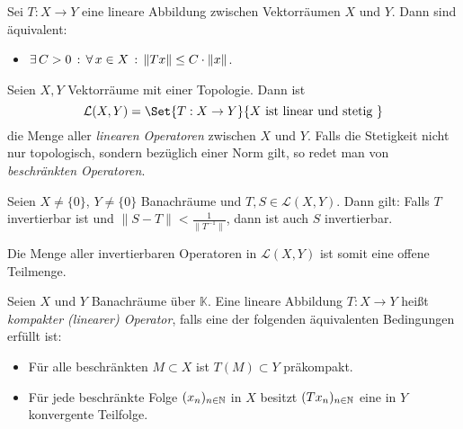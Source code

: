 \documentclass{cheat-sheet}
\newcommand{\K}{\mathbb{K}}
\begin{document}
\begin{satz}
  Sei $T : X \to Y$ eine lineare Abbildung zwischen Vektorräumen $X$ und $Y$. Dann sind äquivalent:
  \begin{itemize}
    \item $\exists \, {C > 0} \,:\, \forall \, {x \in X} \,:\, \|Tx\| \leq C \cdot \|x\|$.
  \end{itemize}
\end{satz}

\begin{defn}
  Seien $X, Y$ Vektorräume mit einer Topologie. Dann ist
  \[ \mathcal{L}(X, Y) = \Set{ T : X \to Y }{ X \text{ ist linear und stetig } } \]
  die Menge aller \emph{linearen Operatoren} zwischen $X$ und $Y$. Falls die Stetigkeit nicht nur topologisch, sondern bezüglich einer Norm gilt, so redet man von \emph{beschränkten Operatoren}.
\end{defn}

\begin{satz}
  Seien $X \not= \{0\}$, $Y \not= \{0\}$ Banachräume und $T, S \in \mathcal{L}(X, Y)$. Dann gilt: Falls $T$ invertierbar ist und $\|S-T\| < \tfrac{1}{\|T^{-1}\|}$, dann ist auch $S$ invertierbar.
\end{satz}

\begin{bem}
  Die Menge aller invertierbaren Operatoren in $\mathcal{L}(X, Y)$ ist somit eine offene Teilmenge.
\end{bem}

\begin{defn}
  Seien $X$ und $Y$ Banachräume über $\K$. Eine lineare Abbildung $T : X \to Y$ heißt \emph{kompakter (linearer) Operator}, falls eine der folgenden äquivalenten Bedingungen erfüllt ist:
  \begin{itemize}
    \item Für alle beschränkten $M \subset X$ ist $T(M) \subset Y$ präkompakt.
    \item Für jede beschränkte Folge $(x_n)_{n \in \mathbb{N}}$ in $X$ besitzt $(T x_n)_{n \in \mathbb{N}}$ eine in $Y$ konvergente Teilfolge.
  \end{itemize}
\end{defn}
\end{document}
